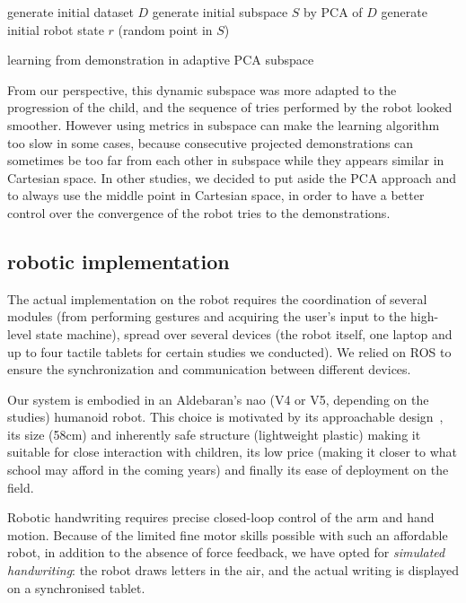 \documentclass{sig-alternate}
\begin{document}
\begin{algorithm}
   generate initial dataset $D$\;
   generate initial subspace $S$ by PCA of $D$\;
   generate initial robot state $r$ (random point in $S$)\;
   \caption{learning from demonstration in adaptive PCA subspace}
\end{algorithm}

From our perspective, this dynamic subspace was more adapted to the 
progression of the child, and the sequence of tries performed by the robot looked smoother.
However using metrics in subspace can make the learning algorithm too slow in some
cases, because consecutive projected demonstrations can sometimes be too
far from each other in subspace while they appears similar in Cartesian space.
In other studies, we decided to put aside the PCA approach and to always use the middle point in Cartesian space, in order to
have a better control over the convergence of the robot tries to the demonstrations.


\subsection{robotic implementation}

The actual implementation on the robot requires the coordination of
several modules (from performing gestures and acquiring the user's input to
the high-level state machine), spread over several devices (the robot itself,
one laptop and up to four tactile tablets for certain studies we conducted). We
relied on ROS to ensure the synchronization and communication between different devices.

Our system is embodied in an Aldebaran's {\sc nao} (V4 or V5, depending on the
studies) humanoid robot. This choice is motivated by its approachable
design~\cite{Gouaillier2008}, its size (58cm) and inherently safe structure
(lightweight plastic) making it suitable for close interaction with children,
its low price (making it closer to what school may afford in the coming years)
and finally its ease of deployment on the field.

Robotic handwriting requires precise closed-loop control of the arm and hand
motion. Because of the limited fine motor skills possible with such an
affordable robot, in addition to the absence of force feedback, we have opted
for \emph{simulated handwriting}: the robot draws letters in the air, and the
actual writing is displayed on a synchronised tablet.
\end{document}
